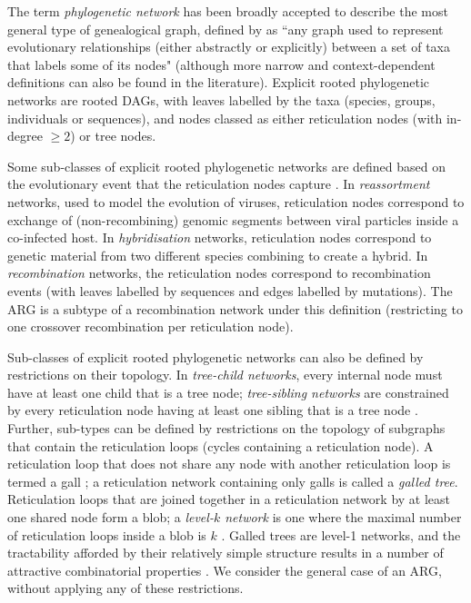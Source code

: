 \documentclass{article}
\begin{document}
The term \emph{phylogenetic network} has been broadly accepted to describe the most general 
type of genealogical graph, defined by \citet{huson2010phylogenetic} as ``any graph used to 
represent evolutionary relationships (either abstractly or explicitly) between a set of taxa 
that labels some of its nodes" (although more narrow and context-dependent definitions can also 
be found in the literature). Explicit rooted phylogenetic networks are rooted DAGs,
with leaves labelled by the taxa (species, groups, individuals or sequences), and nodes classed 
as either reticulation nodes (with in-degree $\geq 2$) or tree nodes. 

Some sub-classes of explicit rooted phylogenetic networks are defined based on the evolutionary event that the
reticulation nodes capture \citep{huson2010phylogenetic}. In \emph{reassortment} networks, used to 
model the evolution of viruses, reticulation nodes correspond to exchange of 
(non-recombining) genomic segments between viral particles inside a co-infected host. 
In \emph{hybridisation} networks, reticulation nodes correspond to genetic material from two
different species combining to create a hybrid. In \emph{recombination} networks, the reticulation nodes 
correspond to recombination events (with leaves labelled by sequences and edges labelled by mutations). 
The ARG is a subtype of a recombination network under this definition (restricting to one crossover 
recombination per reticulation node).

Sub-classes of explicit rooted phylogenetic networks can also be defined by restrictions on their topology. 
In \emph{tree-child networks}, every internal node must have at least one child that is a tree node; 
\emph{tree-sibling networks} are constrained by every reticulation node having at least one sibling that is a 
tree node \citep{cardona2008extended}. Further, sub-types can be defined by restrictions on 
the topology of subgraphs that contain the reticulation loops (cycles containing a reticulation node). 
A reticulation loop that does not share any node with another reticulation loop is termed a gall 
\citep[][p.\ 237]{gusfield2014recombinatorics}; a reticulation network containing only galls is 
called a \emph{galled tree}. Reticulation loops that are joined together in a reticulation network 
by at least one shared node form a blob; a \emph{level-$k$ network} is one where the maximal number 
of reticulation loops inside a blob is $k$ \citep{choy2005computing}. Galled trees are level-1 networks, 
and the tractability afforded by their relatively simple structure results in a number of attractive 
combinatorial properties \citep{wang2001perfect, gusfield2004optimal}. We consider the general case of 
an ARG, without applying any of these restrictions.
\end{document}
